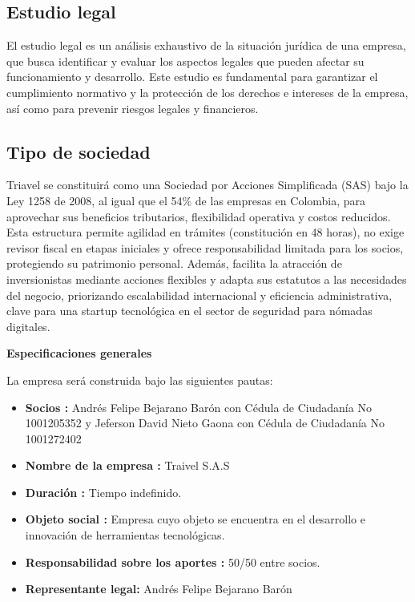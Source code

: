 \subsection{Estudio legal}
El estudio legal es un análisis exhaustivo de la situación jurídica de una empresa, que busca identificar y evaluar los aspectos legales que pueden afectar su funcionamiento y desarrollo. Este estudio es fundamental para garantizar el cumplimiento normativo y la protección de los derechos e intereses de la empresa, así como para prevenir riesgos legales y financieros.

\subsection*{Tipo de sociedad}
Triavel se constituirá como una Sociedad por Acciones Simplificada (SAS) bajo la Ley 1258 de 2008, al igual que el 54\% de las empresas en Colombia, para aprovechar sus beneficios tributarios, flexibilidad operativa y costos reducidos. Esta estructura permite agilidad en trámites (constitución en 48 horas), no exige revisor fiscal en etapas iniciales y ofrece responsabilidad limitada para los socios, protegiendo su patrimonio personal. Además, facilita la atracción de inversionistas mediante acciones flexibles y adapta sus estatutos a las necesidades del negocio, priorizando escalabilidad internacional y eficiencia administrativa, clave para una startup tecnológica en el sector de seguridad para nómadas digitales.

\textbf{Especificaciones generales}
\newline

La empresa será construida bajo las siguientes pautas:

\begin{itemize}
    \item \textbf{Socios : } Andrés Felipe Bejarano Barón con Cédula de Ciudadanía No 1001205352 y Jeferson David Nieto Gaona con Cédula de Ciudadanía No 1001272402 
    \item \textbf{Nombre de la empresa :} Traivel S.A.S
    \item \textbf{Duración :} Tiempo indefinido.
    \item \textbf{Objeto social :} Empresa cuyo objeto se encuentra en el desarrollo e innovación de herramientas tecnológicas.
    \item \textbf{Responsabilidad sobre los aportes :} 50/50 entre socios.
    \item \textbf{Representante legal: } Andrés Felipe Bejarano Barón
\end{itemize}

